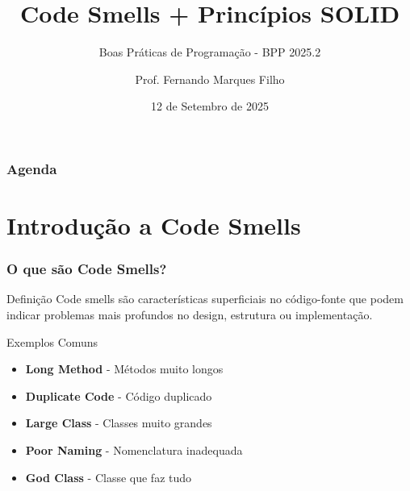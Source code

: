 \documentclass[aspectratio=169]{beamer}
\title{Code Smells + Princípios SOLID}
\subtitle{Boas Práticas de Programação - BPP 2025.2}
\author{Prof. Fernando Marques Filho}
\institute{Universidade Federal do Rio Grande do Norte}
\date{12 de Setembro de 2025}
\begin{document}
\frame{\titlepage}

\begin{frame}
\frametitle{Agenda}
\tableofcontents
\end{frame}

\section{Introdução a Code Smells}

\begin{frame}
\frametitle{O que são Code Smells?}
\begin{center}
\end{center}

\vspace{0.5cm}
\begin{block}{Definição}
\footnotesize
Code smells são características superficiais no código-fonte que podem indicar problemas mais profundos no design, estrutura ou implementação.
\end{block}

\begin{exampleblock}{Exemplos Comuns}
\footnotesize
\begin{itemize}
    \item \textbf{Long Method} - Métodos muito longos
    \item \textbf{Duplicate Code} - Código duplicado
    \item \textbf{Large Class} - Classes muito grandes
    \item \textbf{Poor Naming} - Nomenclatura inadequada
    \item \textbf{God Class} - Classe que faz tudo
\end{itemize}
\end{exampleblock}
\end{frame}
\end{document}
